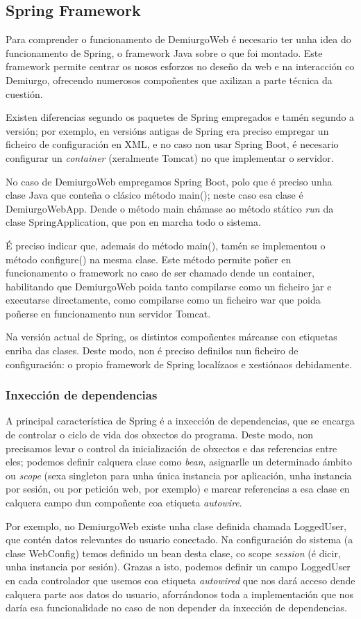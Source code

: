 \subsection{Spring Framework}
Para comprender o funcionamento de DemiurgoWeb é necesario ter unha idea do
funcionamento de Spring, o framework Java sobre o que foi montado. Este
framework permite centrar os nosos esforzos no deseño da web e na interacción co
Demiurgo, ofrecendo numerosos compoñentes que axilizan a parte técnica da
cuestión.
\par
Existen diferencias segundo os paquetes de Spring empregados e tamén segundo a
versión; por exemplo, en versións antigas de Spring era preciso empregar un
ficheiro de configuración en XML, e no caso non usar Spring Boot, é necesario
configurar un \textit{container} (xeralmente Tomcat) no que implementar o
servidor.
\par
No caso de DemiurgoWeb empregamos Spring Boot, polo que é preciso unha clase
Java que conteña o clásico método main(); neste caso esa clase é DemiurgoWebApp.
Dende o método main chámase ao método stático \textit{run} da clase
SpringApplication, que pon en marcha todo o sistema.
\par
É preciso indicar que, ademais do método main(), tamén se implementou o método
configure() na mesma clase. Este método permite poñer en funcionamento o
framework no caso de ser chamado dende un container, habilitando que DemiurgoWeb
poida tanto compilarse como un ficheiro jar e executarse directamente, como
compilarse como un ficheiro war que poida poñerse en funcionamento nun
servidor Tomcat.
\par
Na versión actual de Spring, os distintos compoñentes márcanse con etiquetas
enriba das clases. Deste modo, non é preciso definilos nun ficheiro de
configuración: o propio framework de Spring localízaos e xestiónaos debidamente.

\subsubsection{Inxección de dependencias}
A principal característica de Spring é a inxección de dependencias, que se
encarga de controlar o ciclo de vida dos obxectos do programa. Deste modo, non
precisamos levar o control da inicialización de obxectos e das referencias entre
eles; podemos definir calquera clase como \textit{bean}, asignarlle un
determinado ámbito ou \textit{scope} (sexa singleton para unha única instancia
por aplicación, unha instancia por sesión, ou por petición web, por exemplo) e
marcar referencias a esa clase en calquera campo dun compoñente coa etiqueta
\textit{autowire}.
\par
Por exemplo, no DemiurgoWeb existe unha clase definida chamada LoggedUser, que
contén datos relevantes do usuario conectado. Na configuración do sistema (a
clase WebConfig) temos definido un bean desta clase, co scope \textit{session}
(é dicir, unha instancia por sesión). Grazas a isto, podemos definir un campo
LoggedUser en cada controlador que usemos coa etiqueta \textit{autowired} que
nos dará acceso dende calquera parte aos datos do usuario, aforrándonos toda a
implementación que nos daría esa funcionalidade no caso de non depender da
inxección de dependencias.

